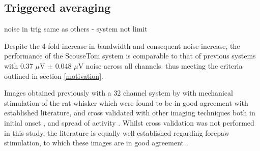 
\subsection{Triggered averaging}


noise in trig same as others - system not limit



Despite the 4-fold increase in bandwidth and consequent noise increase, the performance of the ScouseTom system is comparable to that of previous systems \cite{Oh2011} with 0.37 $\mu$V $\pm$ 0.048 $\mu$V noise across all channels.
 thus meeting the criteria outlined in section \ref{motivation}.

Images obtained previously with a 32 channel system by \citet{Aristovich_2016} with mechanical stimulation of the rat whisker which were found to be in good agreement with established literature, and cross validated with other imaging techniques both in initial onset \cite{armstrong1991thalamo}, and spread of activity \cite{petersen2007functional}. Whilst cross validation was not performed in this study, the literature is equally well established regarding forepaw stimulation, to which these images are in good agreement \cite{peeters2001comparing} \cite{masamoto2007relationship} \cite{lowe2007small}.
